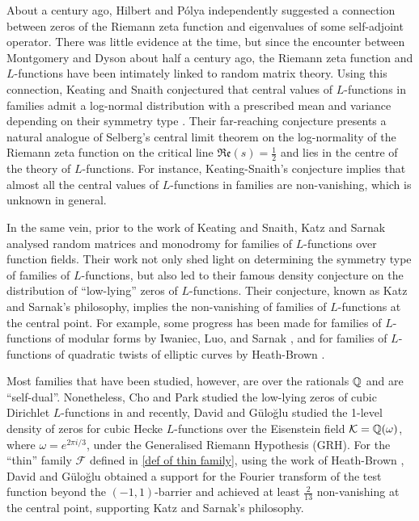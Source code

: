 \documentclass[11pt]{amsart}
\numberwithin{equation}{section}
\renewcommand{\Re}{{\mathfrak{Re}}}
\theoremstyle{remark}
\begin{document}
{About a century ago, Hilbert and P\'{o}lya independently suggested a connection between zeros of the Riemann zeta function and eigenvalues of some self-adjoint operator. There was little evidence at the time, but since the encounter between Montgomery and Dyson about half a century ago, the Riemann zeta function and $L$-functions have been intimately linked to random matrix theory.}
Using this connection, Keating and Snaith conjectured that central values of $L$-functions in families admit a log-normal distribution with a prescribed mean and variance depending on their symmetry type \cite{KS}. Their far-reaching conjecture presents a natural analogue of Selberg's central limit theorem on the log-normality of the Riemann zeta function on the critical line $\Re(s)=\frac{1}{2}$ and lies in the centre of the theory of $L$-functions. For instance, Keating-Snaith's conjecture implies that almost all the central values of $L$-functions in families are non-vanishing, which is unknown in general.

In the same vein, prior to the work of Keating and Snaith, Katz and Sarnak \cite{KaSa, KaSa2}
analysed random matrices and monodromy for families of $L$-functions over function fields. Their work not only shed light on determining the symmetry type of families of $L$-functions, but also led to their famous density conjecture on the distribution of ``low-lying'' zeros of $L$-functions. 
Their conjecture, known as Katz and Sarnak's philosophy, implies the non-vanishing of families of $L$-functions at the central point. 
For example, some progress has been made for families of $L$-functions of modular forms by Iwaniec, Luo, and Sarnak \cite{ILS}, and for families of $L$-functions of quadratic twists of elliptic curves by Heath-Brown \cite{H-B}.

Most families that have been studied, however, 
are over the rationals $\Bbb{Q}$ and are ``self-dual''. Nonetheless, Cho and Park studied the low-lying zeros of cubic Dirichlet $L$-functions in \cite{CP} and recently, David and G\"{u}lo\u{g}lu \cite{DG} studied the 1-level density of zeros for cubic Hecke $L$-functions over the Eisenstein field $\mathcal{K}=\Bbb{Q}(\omega)$, where $\omega=e^{2\pi i/3}$, under the Generalised Riemann Hypothesis (GRH). For the ``thin'' family $\mathcal{F}$ defined in \eqref{def of thin family}, using the work of Heath-Brown \cite{H-B 2}, David and G\"{u}lo\u{g}lu obtained a support for the Fourier transform of the test function beyond the $(-1,1)$-barrier and achieved at least $\frac{2}{13}$ non-vanishing at the central point, supporting Katz and Sarnak's philosophy. 
\end{document}
